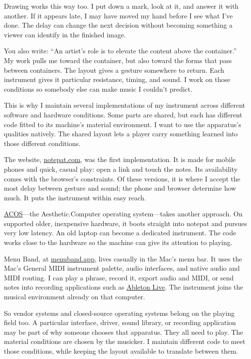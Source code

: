 \documentclass[12pt,letterpaper]{article}
\newcommand{\ac}{Aesthetic\textcolor{acpink}{.}Computer}
\begin{document}
Drawing works this way too. I put down a mark, look at it, and answer it with another. If it appears late, I may have moved my hand before I see what I've done. The delay can change the next decision without becoming something a viewer can identify in the finished image.

\clearpage
\noindent
You also write: “An artist’s role is to elevate the content above the container.” My work pulls me toward the container, but also toward the forms that pass between containers. The layout gives a gesture somewhere to return. Each instrument gives it particular resistance, timing, and sound. I work on those conditions so somebody else can make music I couldn't predict.

This is why I maintain several implementations of my instrument across different software and hardware conditions. Some parts are shared, but each has different code fitted to its machine's material environment. I want to use the apparatus's qualities natively. The shared layout lets a player carry something learned into those different conditions.

The website, \href{https://notepat.com}{notepat.com}, was the first implementation. It is made for mobile phones and quick, casual play: open a link and touch the notes. Its availability comes with the browser's constraints. Of these versions, it is where I accept the most delay between gesture and sound; the phone and browser determine how much. It puts the instrument within easy reach.

\href{https://papers.aesthetic.computer/ac-native-os-26-arxiv.pdf}{ACOS}—the \ac{} operating system—takes another approach. On supported older, inexpensive hardware, it boots straight into notepat and pursues very low latency. An old laptop can become a dedicated instrument. The code works close to the hardware so the machine can give its attention to playing.

Menu Band, at \href{https://menuband.app}{menuband.app}, lives casually in the Mac's menu bar. It uses the Mac's General MIDI instrument palette, audio interfaces, and native audio and MIDI routing. I can play a phrase, record it, export audio and MIDI, or send notes into recording applications such as \href{https://help.ableton.com/hc/en-us/articles/211476789-Setting-up-an-Audio-Interface}{Ableton Live}. The instrument joins the musical environment already on that computer.

So vendor systems and closed-source operating systems belong on the playing field too. A particular interface, driver, sound library, or recording application may be part of why someone chooses that apparatus. They all need to play. The material conditions are chosen by the musicker. I maintain different code to meet those conditions, while keeping the layout available to translate between them.

\end{document}
